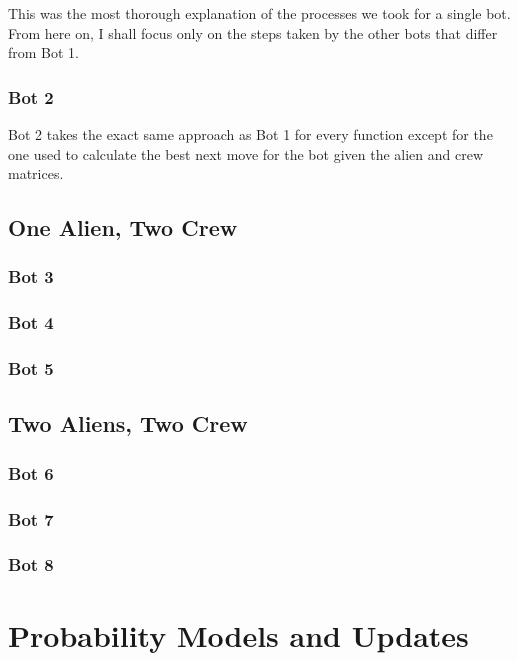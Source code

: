 \documentclass[11pt]{article}
\begin{document}
This was the most thorough explanation of the processes we took for a single bot. From here on, I shall focus only on the steps taken by the other bots that differ from Bot 1.

\subsubsection{Bot 2}

Bot 2 takes the exact same approach as Bot 1 for every function except for the one used to calculate the best next move for the bot given the alien and crew matrices.

\subsection{One Alien, Two Crew}

\subsubsection{Bot 3}

\subsubsection{Bot 4}

\subsubsection{Bot 5}

\subsection{Two Aliens, Two Crew}

\subsubsection{Bot 6}

\subsubsection{Bot 7}

\subsubsection{Bot 8}



\section{Probability Models and Updates}
\end{document}
